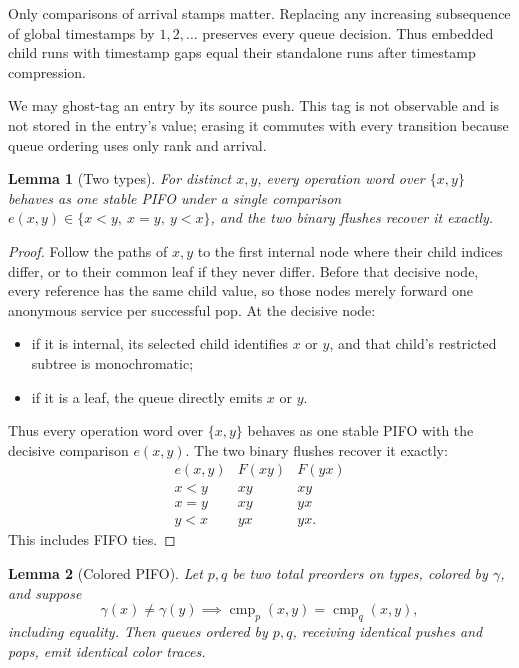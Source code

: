 \documentclass{amsart}
\theoremstyle{plain}
\newtheorem{lemma}{Lemma}
\theoremstyle{definition}
\begin{document}
Only comparisons of arrival stamps matter. Replacing any increasing subsequence of global timestamps by $1,2,\ldots$ preserves every queue decision. Thus embedded child runs with timestamp gaps equal their standalone runs after timestamp compression.

We may ghost-tag an entry by its source push. This tag is not observable and is not stored in the entry's value; erasing it commutes with every transition because queue ordering uses only rank and arrival.

\begin{lemma}[Two types]
For distinct $x,y$, every operation word over $\{x,y\}$ behaves as one stable PIFO under a single
comparison $e(x,y)\in\{x<y,\ x=y,\ y<x\}$, and the two binary flushes recover it exactly.
\end{lemma}

\begin{proof}
Follow the paths of $x,y$ to the first internal node where their child indices differ, or to their common leaf if they never differ. Before that decisive node, every reference has the same child value, so those nodes merely forward one anonymous service per successful pop. At the decisive node:
\begin{itemize}
\item if it is internal, its selected child identifies $x$ or $y$, and that child's restricted subtree is monochromatic;
\item if it is a leaf, the queue directly emits $x$ or $y$.
\end{itemize}
Thus every operation word over $\{x,y\}$ behaves as one stable PIFO with the decisive comparison $e(x,y)$. The two binary flushes recover it exactly:
\begin{equation*}
\begin{array}{c|cc}
e(x,y)&F(xy)&F(yx)\\ \hline
x<y&xy&xy\\
x=y&xy&yx\\
y<x&yx&yx.
\end{array} \tag{2}
\end{equation*}
This includes FIFO ties.
\end{proof}

\begin{lemma}[Colored PIFO]
Let $p,q$ be two total preorders on types, colored by $\gamma$, and suppose
\begin{equation*}
\gamma(x)\ne\gamma(y)
\implies
\operatorname{cmp}_p(x,y)=\operatorname{cmp}_q(x,y), \tag{3}
\end{equation*}
including equality. Then queues ordered by $p,q$, receiving identical pushes and pops, emit identical
color traces.
\end{lemma}
\end{document}
